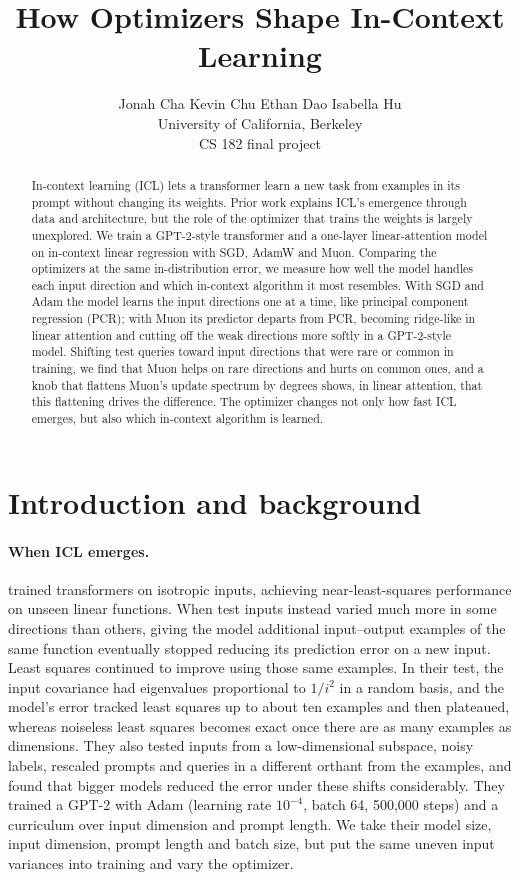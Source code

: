 \documentclass{article}
\title{How Optimizers Shape In-Context Learning}
\author{
Jonah Cha \quad Kevin Chu \quad Ethan Dao \quad Isabella Hu\\
University of California, Berkeley\\
CS 182 final project
}
\begin{document}
\maketitle

\begin{abstract}
In-context learning (ICL) lets a transformer learn a new task from examples in its prompt without changing its weights. Prior work explains ICL's emergence through data and architecture, but the role of the optimizer that trains the weights is largely unexplored. We train a GPT-2-style transformer and a one-layer linear-attention model on in-context linear regression with SGD, AdamW and Muon. Comparing the optimizers at the same in-distribution error, we measure how well the model handles each input direction and which in-context algorithm it most resembles. With SGD and Adam the model learns the input directions one at a time, like principal component regression (PCR); with Muon its predictor departs from PCR, becoming ridge-like in linear attention and cutting off the weak directions more softly in a GPT-2-style model. Shifting test queries toward input directions that were rare or common in training, we find that Muon helps on rare directions and hurts on common ones, and a knob that flattens Muon's update spectrum by degrees shows, in linear attention, that this flattening drives the difference. The optimizer changes not only how fast ICL emerges, but also which in-context algorithm is learned.
\end{abstract}

\section{Introduction and background}
\label{sec:intro}
\paragraph{When ICL emerges.} \citet{garg2022} trained transformers on isotropic inputs, achieving near-least-squares performance on unseen linear functions. When test inputs instead varied much more in some directions than others, giving the model additional input--output examples of the same function eventually stopped reducing its prediction error on a new input. Least squares continued to improve using those same examples. In their test, the input covariance had eigenvalues proportional to $1/i^2$ in a random basis, and the model's error tracked least squares up to about ten examples and then plateaued, whereas noiseless least squares becomes exact once there are as many examples as dimensions. They also tested inputs from a low-dimensional subspace, noisy labels, rescaled prompts and queries in a different orthant from the examples, and found that bigger models reduced the error under these shifts considerably. They trained a GPT-2 \citep{radford2019gpt2} with Adam (learning rate $10^{-4}$, batch 64, 500,000 steps) and a curriculum over input dimension and prompt length. We take their model size, input dimension, prompt length and batch size, but put the same uneven input variances into training and vary the optimizer.
\end{document}
